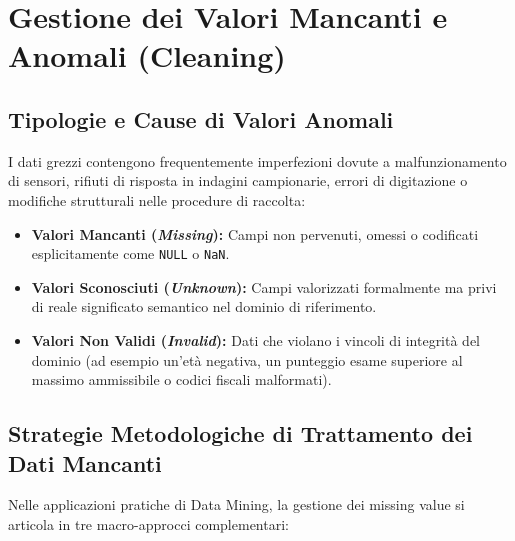 \section{Gestione dei Valori Mancanti e Anomali (Cleaning)}

\subsection{Tipologie e Cause di Valori Anomali}
I dati grezzi contengono frequentemente imperfezioni dovute a malfunzionamento di sensori, rifiuti di risposta in indagini campionarie, errori di digitazione o modifiche strutturali nelle procedure di raccolta:
\begin{itemize}
    \item \textbf{Valori Mancanti (\textit{Missing}):} Campi non pervenuti, omessi o codificati esplicitamente come \texttt{NULL} o \texttt{NaN}.
    \item \textbf{Valori Sconosciuti (\textit{Unknown}):} Campi valorizzati formalmente ma privi di reale significato semantico nel dominio di riferimento.
    \item \textbf{Valori Non Validi (\textit{Invalid}):} Dati che violano i vincoli di integrità del dominio (ad esempio un'età negativa, un punteggio esame superiore al massimo ammissibile o codici fiscali malformati).
\end{itemize}

\subsection{Strategie Metodologiche di Trattamento dei Dati Mancanti}
Nelle applicazioni pratiche di Data Mining, la gestione dei missing value si articola in tre macro-approcci complementari:

